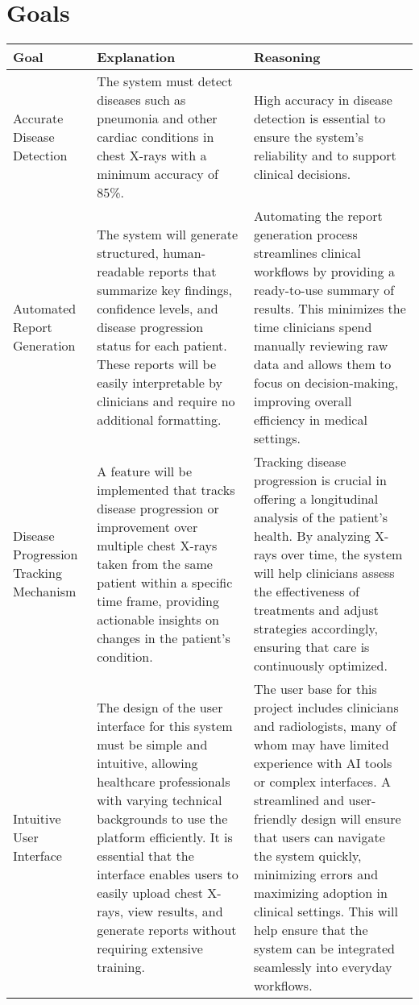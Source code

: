 \documentclass{article}
\begin{document}
\section{Goals}
\begin{table}[H] %
    \hspace*{-2cm}
    \centering
    \begin{tabular}{|p{3cm}|p{6cm}|p{6cm}|}
    \hline
    \textbf{Goal} & \textbf{Explanation} & \textbf{Reasoning} \\ \hline
    Accurate Disease Detection & The system must detect diseases such as pneumonia and other cardiac conditions in chest X-rays with a minimum accuracy of 85\%. & High accuracy in disease detection is essential to ensure the system’s reliability and to support clinical decisions. \\ \hline

    Automated Report Generation & The system will generate structured, human-readable reports that summarize key findings, confidence levels, and disease progression status for each patient. These reports will be easily interpretable by clinicians and require no additional formatting. & Automating the report generation process streamlines clinical workflows by providing a ready-to-use summary of results. This minimizes the time clinicians spend manually reviewing raw data and allows them to focus on decision-making, improving overall efficiency in medical settings. \\ \hline
    
    Disease Progression Tracking Mechanism & A feature will be implemented that tracks disease progression or improvement over multiple chest X-rays taken from the same patient within a specific time frame, providing actionable insights on changes in the patient’s condition. &Tracking disease progression is crucial in offering a longitudinal analysis of the patient's health. By analyzing X-rays over time, the system will help clinicians assess the effectiveness of treatments and adjust strategies accordingly, ensuring that care is continuously optimized.\\ \hline

    Intuitive User Interface & The design of the user interface for this system must be simple and intuitive, allowing healthcare professionals with varying technical backgrounds to use the platform efficiently. It is essential that the interface enables users to easily upload chest X-rays, view results, and generate reports without requiring extensive training. &The user base for this project includes clinicians and radiologists, many of whom may have limited experience with AI tools or complex interfaces. A streamlined and user-friendly design will ensure that users can navigate the system quickly, minimizing errors and maximizing adoption in clinical settings. This will help ensure that the system can be integrated seamlessly into everyday workflows.  \\ \hline
    

\end{tabular}
\end{table}
\end{document}
